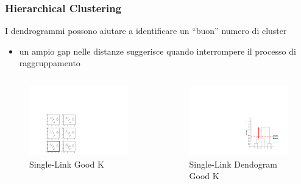 \begin{frame}

	\frametitle{{\color{GradientDescentDiagramGreen}Hierarchical Clustering}}


		I dendrogrammi possono aiutare a identificare un ``buon'' numero di cluster
		\begin{itemize}
			\item un ampio gap nelle distanze suggerisce quando interrompere il processo di raggruppamento
		\end{itemize}

		\begin{columns}

			\begin{figure}[!htbp]
				\centering
				\includegraphics[angle=0,width=0.50\linewidth]{images/unsupervised/hierarchical/hierarchical_single_link_red.pdf}
				\caption{Single-Link Good K}
			\end{figure}

			\begin{figure}[!htbp]
				\centering
				\includegraphics[angle=0,width=0.65\linewidth]{images/unsupervised/hierarchical/hierarchical_single_link_dendogram_red.pdf}
				\caption{Single-Link Dendogram Good K}
			\end{figure}

		\end{columns}


\end{frame}


